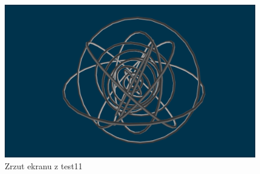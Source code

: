 \documentclass[11pt]{article}
\begin{document}
\begin{figure}[htbp]
\centering
\includegraphics[width=.9\linewidth]{img/test11.png}
\caption{Zrzut ekranu z test11}
\end{figure}
\end{document}
